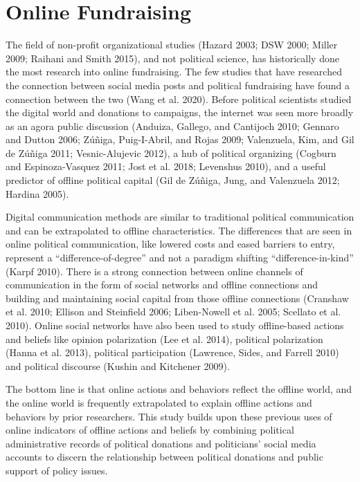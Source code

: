 \documentclass[12pt,]{article}
\begin{document}
\hypertarget{online-fundraising}{%
\section{Online Fundraising}\label{online-fundraising}}

The field of non-profit organizational studies (Hazard 2003; DSW 2000;
Miller 2009; Raihani and Smith 2015), and not political science, has
historically done the most research into online fundraising. The few
studies that have researched the connection between social media posts
and political fundraising have found a connection between the two (Wang
et al. 2020). Before political scientists studied the digital world and
donations to campaigns, the internet was seen more broadly as an agora
public discussion (Anduiza, Gallego, and Cantijoch 2010; Gennaro and
Dutton 2006; Zúñiga, Puig-I-Abril, and Rojas 2009; Valenzuela, Kim, and
Gil de Zúñiga 2011; Vesnic-Alujevic 2012), a hub of political organizing
(Cogburn and Espinoza-Vasquez 2011; Jost et al. 2018; Levenshus 2010),
and a useful predictor of offline political capital (Gil de Zúñiga,
Jung, and Valenzuela 2012; Hardina 2005).

Digital communication methods are similar to traditional political
communication and can be extrapolated to offline characteristics. The
differences that are seen in online political communication, like
lowered costs and eased barriers to entry, represent a
``difference-of-degree'' and not a paradigm shifting
``difference-in-kind'' (Karpf 2010). There is a strong connection
between online channels of communication in the form of social networks
and offline connections and building and maintaining social capital from
those offline connections (Cranshaw et al. 2010; Ellison and Steinfield
2006; Liben-Nowell et al. 2005; Scellato et al. 2010). Online social
networks have also been used to study offline-based actions and beliefs
like opinion polarization (Lee et al. 2014), political polarization
(Hanna et al. 2013), political participation (Lawrence, Sides, and
Farrell 2010) and political discourse (Kushin and Kitchener 2009).

The bottom line is that online actions and behaviors reflect the offline
world, and the online world is frequently extrapolated to explain
offline actions and behaviors by prior researchers. This study builds
upon these previous uses of online indicators of offline actions and
beliefs by combining political administrative records of political
donations and politicians' social media accounts to discern the
relationship between political donations and public support of policy
issues.
\end{document}
